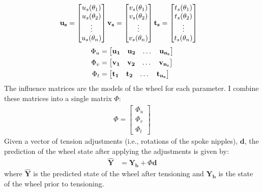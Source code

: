 \documentclass[journal]{IEEEtran}
\begin{document}
\begin{align*}
    \bf u_s &=  \begin{bmatrix}
        u_s(\theta_1)\\
        u_s(\theta_2)\\
        \vdots\\
        u_s(\theta_n)
        \end{bmatrix}
    \bf v_s = \begin{bmatrix}
        v_s(\theta_1)\\
        v_s(\theta_2)\\
        \vdots\\
        v_s(\theta_n)
    \end{bmatrix}
        \bf t_s = \begin{bmatrix}
        t_s(\theta_1)\\
        t_s(\theta_2)\\
        \vdots\\
        t_s(\theta_n)
    \end{bmatrix}
    \end{align*}
    \begin{align*}
     \Phi_u &= \begin{bmatrix}
     \bf u_1 & \bf u_2& \dots & \bf u_{n_s}
     \end{bmatrix}\\
     \Phi_v &= \begin{bmatrix}
     \bf v_1 & \bf v_2& \dots & \bf v_{n_s}
     \end{bmatrix}\\     
     \Phi_t &= \begin{bmatrix}
     \bf t_1 & \bf t_2& \dots & \bf t_{n_s}
     \end{bmatrix} 
\end{align*}
The influence matrices are the models of the wheel for each parameter.  I combine these matrices into a single matrix $\Phi$:
 \begin{align}
 \Phi = 
     \begin{bmatrix}
         \Phi_u\\
         \Phi_v\\
         \Phi_t
     \end{bmatrix}
     \label{eq:phi}
 \end{align}
Given a vector of tension adjustments (i.e., rotations of the spoke nipples), $\mathbf d$, the prediction of the wheel state after applying the adjustments is given by:
\begin{align}
\mathbf{\hat Y} &= 
     \mathbf{Y_b} + \Phi  \mathbf{d} 
     \label{eq:Y_hat}
 \end{align}
where $\mathbf{\hat Y}$ is the predicted state of the wheel after tensioning and $\mathbf{Y_b}$ is the state of the wheel prior to tensioning. 
\end{document}
